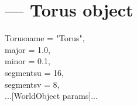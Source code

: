 
\section{ ---
         Torus object}

\begin{classdesc}{Torus}{name = "Torus",\\ 
                         major = 1.0,\\
                         minor = 0.1,\\
                         segmentsu = 16,\\
                         segmentsv = 8,\\
                         ...[WorldObject params]...
	   	       }

\end{classdesc}


